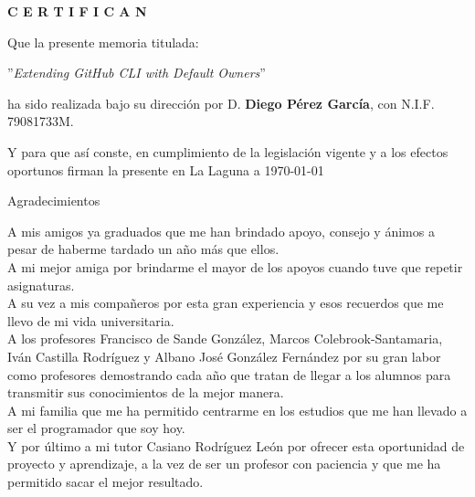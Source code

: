 \documentclass[spanish,a4paper,12pt,oneside]{extreport}
\begin{document}
\bigskip
\bigskip
{\bf C E R T I F I C A N}

\bigskip
\bigskip
Que la presente memoria titulada:

\bigskip
''{\it Extending GitHub CLI with Default Owners}''
\bigskip
\bigskip
\bigskip

\noindent ha sido realizada bajo su dirección por D. {\bf Diego Pérez García},
con N.I.F. 79081733M.

\bigskip
\bigskip

Y para que así conste, en cumplimiento de la legislación vigente y a los efectos
oportunos firman la presente en La Laguna a \today

\newpage
\thispagestyle{empty}

\begin{LARGE}
  Agradecimientos
\end{LARGE}

\hspace{3mm}

\begin{large}
  A mis amigos ya graduados que me han brindado apoyo, consejo y ánimos a pesar de haberme tardado un año más que ellos. \\
  A mi mejor amiga por brindarme el mayor de los apoyos cuando tuve que repetir asignaturas. \\
  A su vez a mis compañeros por esta gran experiencia y esos recuerdos que me llevo de mi vida universitaria. \\
  A los profesores Francisco de Sande González, Marcos Colebrook-Santamaria, Iván Castilla Rodríguez y Albano José González Fernández por su gran labor como profesores demostrando cada año que tratan de llegar a los alumnos para transmitir sus conocimientos de la mejor manera. \\
  A mi familia que me ha permitido centrarme en los estudios que me han llevado a ser el programador que soy hoy. \\
  Y por último a mi tutor Casiano Rodríguez León por ofrecer esta oportunidad de proyecto y aprendizaje, a la vez de ser un profesor con paciencia y que me ha permitido sacar el mejor resultado. \\
\end{large}

\newpage
\thispagestyle{empty}
\end{document}
